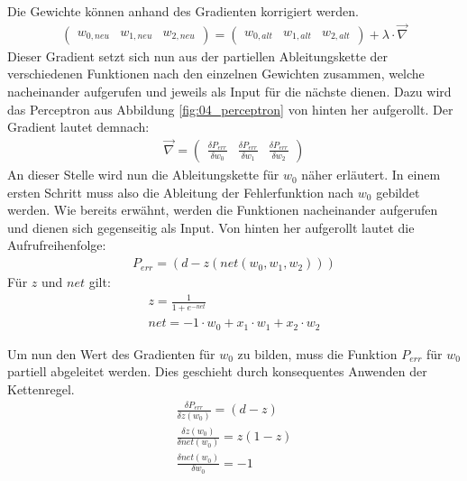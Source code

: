 Die Gewichte können anhand des Gradienten korrigiert werden.
\begin{align}
    \begin{pmatrix}w_{0, neu} & w_{1, neu} & w_{2, neu}\end{pmatrix} = \begin{pmatrix}w_{0, alt} & w_{1, alt} & w_{2, alt}\end{pmatrix} + \lambda \cdot \vec{\nabla}
\end{align}
Dieser Gradient setzt sich nun aus der partiellen Ableitungskette der verschiedenen Funktionen nach den einzelnen
Gewichten zusammen, welche nacheinander aufgerufen und jeweils als Input für die nächste dienen.
Dazu wird das Perceptron aus Abbildung \ref{fig:04_perceptron} von hinten her aufgerollt. Der Gradient lautet demnach:
\begin{align}
    \vec{\nabla} = \begin{pmatrix}\frac{\delta P_{err}}{\delta w_0} & \frac{\delta P_{err}}{\delta w_1} & \frac{\delta P_{err}}{\delta w_2} \end{pmatrix}
\end{align}
An dieser Stelle wird nun die Ableitungskette für $w_0$ näher erläutert. In einem ersten Schritt muss also die
Ableitung der Fehlerfunktion nach $w_0$ gebildet werden. Wie bereits erwähnt, werden die Funktionen nacheinander
aufgerufen und dienen sich gegenseitig als Input. Von hinten her aufgerollt lautet die Aufrufreihenfolge:
\begin{align}
    P_{err} = (d - z(net(w_0, w_1, w_2)))
\end{align}
Für $z$ und $net$ gilt:
\begin{align}
    z = \frac{1}{1 + e^{-net}}\\
    net = -1 \cdot w_0 + x_1 \cdot w_1 + x_2 \cdot w_2
\end{align}

Um nun den Wert des Gradienten für $w_0$ zu bilden, muss die Funktion $P_{err}$ für $w_0$ partiell abgeleitet
werden. Dies geschieht durch konsequentes Anwenden der Kettenregel.
\begin{align}
    \frac{\delta P_{err}}{\delta z(w_0)} = (d - z)\\
    \frac{\delta z(w_0)}{\delta net(w_0)} = z (1 - z)\\
    \frac{\delta net(w_0)}{\delta w_0} = -1
\end{align}

